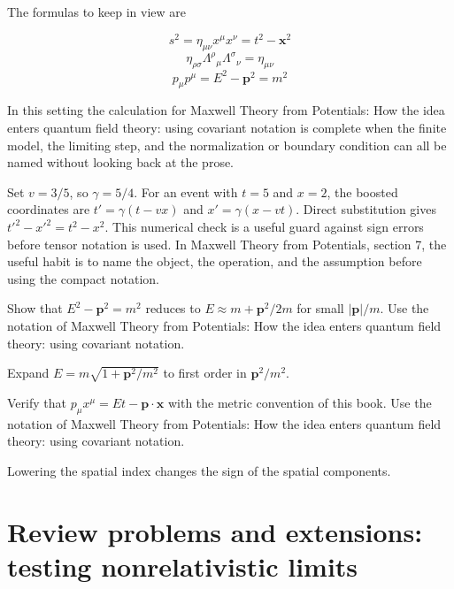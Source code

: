 The formulas to keep in view are

\[
  s^2=\eta_{\mu\nu}x^\mu x^\nu=t^2-\bm x^2
\]
\[
  \eta_{\rho\sigma}\Lambda^\rho{}_\mu\Lambda^\sigma{}_\nu=\eta_{\mu\nu}
\]
\[
  p_\mu p^\mu=E^2-\bm p^2=m^2
\]

In this setting the calculation for Maxwell Theory from Potentials: How the idea enters quantum field theory: using covariant notation is complete when the finite model, the limiting step, and the normalization or boundary condition can all be named without looking back at the prose.




\begin{example}
Set \(v=3/5\), so \(\gamma=5/4\).  For an event with \(t=5\) and \(x=2\), the boosted coordinates are \(t'=\gamma(t-vx)\) and \(x'=\gamma(x-vt)\).  Direct substitution gives \(t'^2-x'^2=t^2-x^2\).  This numerical check is a useful guard against sign errors before tensor notation is used.  In Maxwell Theory from Potentials, section 7, the useful habit is to name the object, the operation, and the assumption before using the compact notation.
\end{example}



\begin{exercise}
Show that \(E^2-\bm p^2=m^2\) reduces to \(E\approx m+\bm p^2/2m\) for small \(|\bm p|/m\).  Use the notation of Maxwell Theory from Potentials: How the idea enters quantum field theory: using covariant notation.
\begin{answer}
Expand \(E=m\sqrt{1+\bm p^2/m^2}\) to first order in \(\bm p^2/m^2\).
\end{answer}
\end{exercise}

\begin{exercise}
Verify that \(p_\mu x^\mu=Et-\bm p\cdot\bm x\) with the metric convention of this book.  Use the notation of Maxwell Theory from Potentials: How the idea enters quantum field theory: using covariant notation.
\begin{answer}
Lowering the spatial index changes the sign of the spatial components.
\end{answer}
\end{exercise}



\section{Review problems and extensions: testing nonrelativistic limits}

